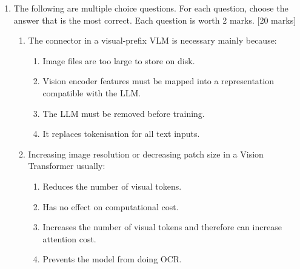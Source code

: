 \documentclass[11pt,a4paper]{article}
\newcommand{\pts}[1]{\hfill [#1 marks]}
\begin{document}
\begin{enumerate}[leftmargin=*]
\begin{enumerate}
\item Compare a text-only tool-using agent with a vision-based computer-use agent for this booking task. Give one advantage and one disadvantage of each. \pts{4}

\item A vision-based computer-use agent is trained on trajectories of the form
\[
I, s_0, a_0, s_1, a_1, \ldots, s_T, a_T .
\]
Explain what \(I\), \(s_t\), and \(a_t\) represent, and why trajectory history matters. \pts{3}

\item Describe two reliability or safety failure modes for this agent and one mitigation for each. At least one failure mode should involve the action space or UI state. \pts{3}

\item The museum asks whether the agent should be evaluated only by final task success rate. Explain why this is insufficient and name two additional quantities or behaviours that should be evaluated. \pts{2}
\end{enumerate}

\newpage

\item The following are multiple choice questions. For each question, choose the answer that is the most correct. Each question is worth 2 marks. \pts{20}

\begin{enumerate}
\item The connector in a visual-prefix VLM is necessary mainly because:
\begin{enumerate}[label=\Alph*.]
\item Image files are too large to store on disk.
\item Vision encoder features must be mapped into a representation compatible with the LLM.
\item The LLM must be removed before training.
\item It replaces tokenisation for all text inputs.
\end{enumerate}

\item Increasing image resolution or decreasing patch size in a Vision Transformer usually:
\begin{enumerate}[label=\Alph*.]
\item Reduces the number of visual tokens.
\item Has no effect on computational cost.
\item Increases the number of visual tokens and therefore can increase attention cost.
\item Prevents the model from doing OCR.
\end{enumerate}


\end{enumerate}
\end{enumerate}
\end{document}
